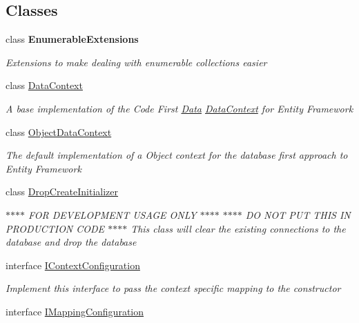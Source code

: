 \subsection*{Classes}
\begin{DoxyCompactItemize}
\item 
class {\bfseries Enumerable\-Extensions}
\begin{DoxyCompactList}\small\item\em Extensions to make dealing with enumerable collections easier \end{DoxyCompactList}\item 
class \hyperlink{class_highway_1_1_data_1_1_data_context}{Data\-Context}
\begin{DoxyCompactList}\small\item\em A base implementation of the Code First \hyperlink{namespace_highway_1_1_data}{Data} \hyperlink{class_highway_1_1_data_1_1_data_context}{Data\-Context} for Entity Framework \end{DoxyCompactList}\item 
class \hyperlink{class_highway_1_1_data_1_1_object_data_context}{Object\-Data\-Context}
\begin{DoxyCompactList}\small\item\em The default implementation of a Object context for the database first approach to Entity Framework \end{DoxyCompactList}\item 
class \hyperlink{class_highway_1_1_data_1_1_drop_create_initializer-g}{Drop\-Create\-Initializer}
\begin{DoxyCompactList}\small\item\em $\ast$$\ast$$\ast$$\ast$ F\-O\-R D\-E\-V\-E\-L\-O\-P\-M\-E\-N\-T U\-S\-A\-G\-E O\-N\-L\-Y $\ast$$\ast$$\ast$$\ast$ $\ast$$\ast$$\ast$$\ast$ D\-O N\-O\-T P\-U\-T T\-H\-I\-S I\-N P\-R\-O\-D\-U\-C\-T\-I\-O\-N C\-O\-D\-E $\ast$$\ast$$\ast$$\ast$ This class will clear the existing connections to the database and drop the database \end{DoxyCompactList}\item 
interface \hyperlink{interface_highway_1_1_data_1_1_i_context_configuration}{I\-Context\-Configuration}
\begin{DoxyCompactList}\small\item\em Implement this interface to pass the context specific mapping to the constructor \end{DoxyCompactList}\item 
interface \hyperlink{interface_highway_1_1_data_1_1_i_mapping_configuration}{I\-Mapping\-Configuration}

\end{DoxyCompactItemize}
